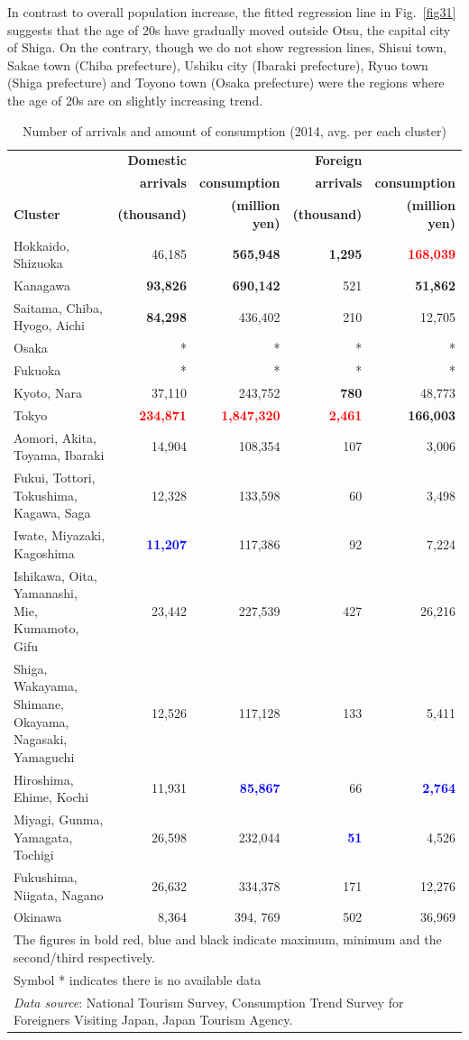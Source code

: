 \documentclass[10pt, conference, compsocconf]{IEEEtran}
\newcommand{\mr}[1]{\textcolor{red}{\bf#1}}%
\newcommand{\mb}[1]{\textcolor{blue}{\bf#1}}%
\begin{document}
In contrast to overall population increase, the fitted regression line in Fig.~\ref{fig31} suggests that the age of 20s have gradually moved outside Otsu, the capital city of Shiga.
On the contrary, though we do not show regression lines, 
 Shisui town, Sakae town (Chiba prefecture), Ushiku city (Ibaraki prefecture), Ryuo town (Shiga prefecture) and Toyono town (Osaka prefecture) were the regions where the age of 20s are on slightly increasing trend.
 
 \begin{table}[!t]\caption{Number of arrivals and amount of consumption (2014, avg. per each cluster)}\label{consume}
\centering
\begin{tabular}{lrrrr}
\hline
 &\bf  Domestic &  & \bf Foreign\\
 & \bf arrivals & \bf consumption & \bf arrivals & \bf consumption \\
\bf Cluster & \bf (thousand) & \bf (million yen) & \bf (thousand) & \bf (million yen) \\\hline
Hokkaido,  Shizuoka & 46,185 & \bf{565,948} & \bf{1,295} & \ \mr{168,039} \\
Kanagawa & \bf{93,826} & \bf{690,142} & 521 & \bf{51,862} \\
Saitama, Chiba, Hyogo, Aichi & \bf{84,298} & 436,402 & 210 & 12,705 \\
Osaka & * & * & * & * \\
Fukuoka & * & * & * & * \\
Kyoto, Nara & 37,110 & 243,752 & \bf{780} & 48,773 \\
Tokyo & \mr{234,871} & \mr{1,847,320} & \mr{2,461} & \bf{166,003} \\
Aomori, Akita, Toyama, Ibaraki & 14,904 & 108,354 & 107 & 3,006 \\
Fukui, Tottori, Tokushima, Kagawa, Saga & 12,328 & 133,598 & 60 & 3,498 \\
Iwate,  Miyazaki,  Kagoshima & \mb{11,207} & 117,386 & 92 & 7,224 \\
Ishikawa, Oita, Yamanashi, Mie, Kumamoto, Gifu & 23,442 & 227,539 & 427 & 26,216 \\
Shiga,  Wakayama,  Shimane,  Okayama,  Nagasaki,  Yamaguchi & 12,526 & 117,128 & 133 & 5,411 \\
Hiroshima, Ehime, Kochi & 11,931 & \mb{85,867} & 66 & \mb{2,764} \\
Miyagi,  Gunma,  Yamagata,  Tochigi & 26,598 & 232,044 & \mb{51} & 4,526 \\
Fukushima, Niigata, Nagano & 26,632 & 334,378 & 171 & 12,276 \\
Okinawa & 8,364 & 394, 769 & 502 & 36,969 \\\hline
\multicolumn{5}{l}{The figures in bold red, blue and black indicate maximum, minimum and the second/third respectively.}\\
\multicolumn{5}{l}{Symbol * indicates there is no available data}\\
\multicolumn{5}{l}{{\it Data source}: National Tourism Survey, Consumption Trend Survey for Foreigners Visiting Japan, Japan Tourism Agency.}
\end{tabular}
\end{table}
\end{document}
